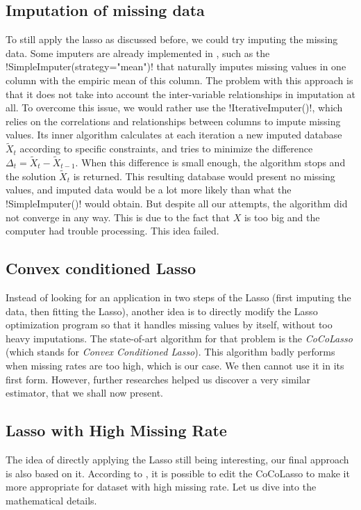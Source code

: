 \documentclass[]{article}
\begin{document}
\subsection{Imputation of missing data}
To still apply the lasso as discussed before, we could try imputing the missing data. Some imputers are already implemented in \sklearn, such as the \pyth!SimpleImputer(strategy="mean")! that naturally imputes missing values in one column with the empiric mean of this column. The problem with this approach is that it does not take into account the inter-variable relationships in imputation at all. To overcome this issue, we would rather use the \pyth!IterativeImputer()!, which relies on the correlations and relationships between columns to impute missing values. Its inner algorithm calculates at each iteration a new imputed database $\tilde{X}_t$ according to specific constraints, and tries to minimize the difference $\Delta_t = \tilde{X}_{t} - \tilde{X}_{t-1}$. When this difference is small enough, the algorithm stops and the solution $\tilde{X}_t$ is returned. This resulting database would present no missing values, and imputed data would be a lot more likely than what the \pyth!SimpleImputer()! would obtain. But despite all our attempts, the algorithm did not converge in any way. This is due to the fact that $X$ is too big and the computer had trouble processing. This idea failed.

\subsection{Convex conditioned Lasso}
Instead of looking for an application in two steps of the Lasso (first imputing the data, then fitting the Lasso), another idea is to directly modify the Lasso optimization program so that it handles missing values by itself, without too heavy imputations. The state-of-art algorithm for that problem is the \textit{CoCoLasso} (which stands for \textit{Convex Conditioned Lasso}). This algorithm badly performs when missing rates are too high, which is our case. We then cannot use it in its first form. However, further researches helped us discover a very similar estimator, that we shall now present.

\subsection{Lasso with High Missing Rate}
The idea of directly applying the Lasso still being interesting, our final approach is also based on it. According to 
\cite{hmlasso2019}, it is possible to edit the CoCoLasso to make it more appropriate for dataset with high missing rate. Let us dive into the mathematical details.\\
\end{document}

